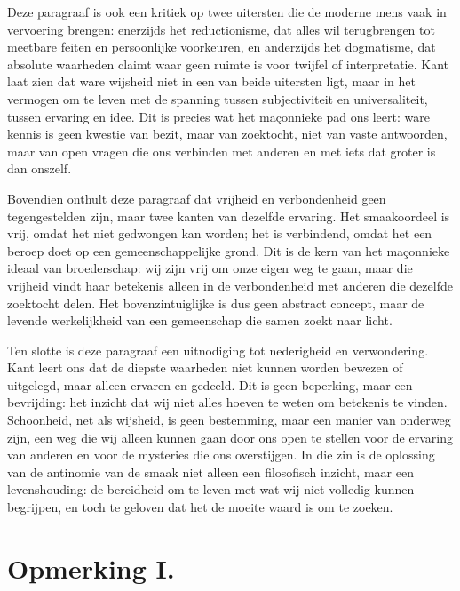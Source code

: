 \begin{mdframed}[leftmargin=0pt,rightmargin=0pt,backgroundcolor=blue!6,linecolor=white,innertopmargin=6pt,innerbottommargin=6pt]
Deze paragraaf is ook een kritiek op twee uitersten die de moderne mens vaak in vervoering brengen: enerzijds het reductionisme, dat alles wil terugbrengen tot meetbare feiten en persoonlijke voorkeuren, en anderzijds het dogmatisme, dat absolute waarheden claimt waar geen ruimte is voor twijfel of interpretatie. Kant laat zien dat ware wijsheid niet in een van beide uitersten ligt, maar in het vermogen om te leven met de spanning tussen subjectiviteit en universaliteit, tussen ervaring en idee. Dit is precies wat het maçonnieke pad ons leert: ware kennis is geen kwestie van bezit, maar van zoektocht, niet van vaste antwoorden, maar van open vragen die ons verbinden met anderen en met iets dat groter is dan onszelf.

Bovendien onthult deze paragraaf dat vrijheid en verbondenheid geen tegengestelden zijn, maar twee kanten van dezelfde ervaring. Het smaakoordeel is vrij, omdat het niet gedwongen kan worden; het is verbindend, omdat het een beroep doet op een gemeenschappelijke grond. Dit is de kern van het maçonnieke ideaal van broederschap: wij zijn vrij om onze eigen weg te gaan, maar die vrijheid vindt haar betekenis alleen in de verbondenheid met anderen die dezelfde zoektocht delen. Het bovenzintuiglijke is dus geen abstract concept, maar de levende werkelijkheid van een gemeenschap die samen zoekt naar licht.

Ten slotte is deze paragraaf een uitnodiging tot nederigheid en verwondering. Kant leert ons dat de diepste waarheden niet kunnen worden bewezen of uitgelegd, maar alleen ervaren en gedeeld. Dit is geen beperking, maar een bevrijding: het inzicht dat wij niet alles hoeven te weten om betekenis te vinden. Schoonheid, net als wijsheid, is geen bestemming, maar een manier van onderweg zijn, een weg die wij alleen kunnen gaan door ons open te stellen voor de ervaring van anderen en voor de mysteries die ons overstijgen. In die zin is de oplossing van de antinomie van de smaak niet alleen een filosofisch inzicht, maar een levenshouding: de bereidheid om te leven met wat wij niet volledig kunnen begrijpen, en toch te geloven dat het de moeite waard is om te zoeken.

\end{mdframed}

\section*{Opmerking I.}

